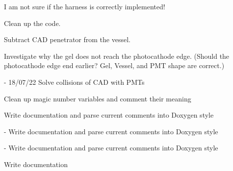 
\begin{DoxyRefList}
\item[Member \mbox{\hyperlink{class_d_e_g_g_a2bcfb59a4bfa47e91a5ad00745fd5989}{DEGG\+::DEGG}} (G4bool p\+Place\+Harness=true)]\label{todo__todo000004}%
%

\begin{DoxyItemize}
\item I am not sure if the harness is correctly implemented!
\item Clean up the code.
\item Subtract CAD penetrator from the vessel.
\item Investigate why the gel does not reach the photocathode edge. (Should the photocathode edge end earlier? Gel, Vessel, and PMT shape are correct.)  
\end{DoxyItemize}
\item[Member \mbox{\hyperlink{class_l_o_m16_a93c141790620554394cdf9864096d011}{LOM16\+::$\sim$\+LOM16}} ()]\label{todo__todo000005}%
%
-\/ 18/07/22 Solve collisions of CAD with PMTs
\begin{DoxyItemize}
\item Clean up magic number variables and comment their meaning
\item Write documentation and parse current comments into Doxygen style  
\end{DoxyItemize}
\item[Member \mbox{\hyperlink{classm_d_o_m_afd95205edb92f86b5c8d4e5642a58e3c}{m\+DOM\+::$\sim$m\+DOM}} ()]\label{todo__todo000007}%
%
-\/ Write documentation and parse current comments into Doxygen style  
\item[Member \mbox{\hyperlink{classm_d_o_m_harness_ad83b869a9aa373be038889f61608d3c6}{m\+DOMHarness\+::m\+DOMHarness}} (\mbox{\hyperlink{classm_d_o_m}{m\+DOM}} $\ast$p\+MDOM)]\label{todo__todo000008}%
%
-\/ Write documentation and parse current comments into Doxygen style  
\item[File \mbox{\hyperlink{_o_m_sim_d_e_g_g_harness_8hh}{OMSim\+DEGGHarness.hh}} ]\label{todo__todo000003}%
%
Write documentation



\end{DoxyRefList}
